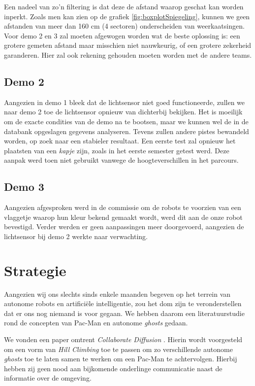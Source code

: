 \documentclass[12pt,a4paper]{report}
\begin{document}
Een nadeel van zo'n filtering is dat deze de afstand waarop geschat kan worden inperkt. Zoals men kan zien op de grafiek \ref{fig:boxplotSpiegeling}, kunnen we geen afstanden van meer dan 160 cm (4 sectoren) onderscheiden van weerkaatsingen. Voor demo 2 en 3 zal moeten afgewogen worden wat de beste oplossing is: een grotere gemeten afstand maar misschien niet nauwkeurig, of een grotere zekerheid garanderen. Hier zal ook rekening gehouden moeten worden met de andere teams. 

\section{Demo 2}

Aangezien in demo 1 bleek dat de lichtsensor niet goed functioneerde, zullen we naar demo 2 toe de lichtsensor opnieuw van dichterbij bekijken. Het is moeilijk om de exacte condities van de demo na te bootsen, maar we kunnen wel de in de databank opgeslagen gegevens analyseren. Tevens zullen andere pistes bewandeld worden, op zoek naar een stabieler resultaat. Een eerste test zal opnieuw het plaatsten van een \emph{kapje} zijn, zoals in het eerste semester getest werd. Deze aanpak werd toen niet gebruikt vanwege de hoogteverschillen in het parcours. 

\section{Demo 3}

Aangezien afgesproken werd in de commissie om de robots te voorzien van een vlaggetje waarop hun kleur bekend gemaakt wordt, werd dit aan de onze robot bevestigd. Verder werden er geen aanpassingen meer doorgevoerd, aangezien de lichtsensor bij demo 2 werkte naar verwachting.

\chapter{Strategie}

Aangezien wij ons slechts sinds enkele maanden begeven op het terrein van autonome robots en artifici\"ele intelligentie, zou het dom zijn te veronderstellen dat er ons nog niemand is voor gegaan. We hebben daarom een literatuurstudie rond de concepten van Pac-Man en autonome \emph{ghosts} gedaan.

We vonden een paper omtrent \emph{Collaborate Diffusion} \cite{Repenning06}. Hierin wordt voorgesteld om een vorm van \emph{Hill Climbing} toe te passen om zo verschillende autonome \emph{ghosts} toe te laten samen te werken om een Pac-Man te achtervolgen. Hierbij hebben zij geen nood aan bijkomende onderlinge communicatie naast de informatie over de omgeving.
\end{document}
